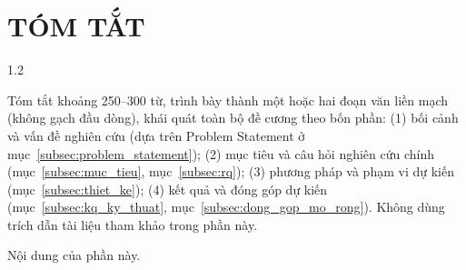 
{}
\chapter*{TÓM TẮT}

\begin{spacing}{1.2}

\begin{huongdan}
Tóm tắt khoảng 250--300 từ, trình bày thành một hoặc hai đoạn văn liền mạch (không gạch đầu dòng), khái quát toàn bộ đề cương theo bốn phần: (1) bối cảnh và vấn đề nghiên cứu (dựa trên Problem Statement ở mục~\ref{subsec:problem_statement}); (2) mục tiêu và câu hỏi nghiên cứu chính (mục~\ref{subsec:muc_tieu}, mục~\ref{subsec:rq}); (3) phương pháp và phạm vi dự kiến (mục~\ref{subsec:thiet_ke}); (4) kết quả và đóng góp dự kiến (mục~\ref{subsec:kq_ky_thuat}, mục~\ref{subsec:dong_gop_mo_rong}). Không dùng trích dẫn tài liệu tham khảo trong phần này.
\end{huongdan}

Nội dung của phần này.

\end{spacing}

\clearpage

